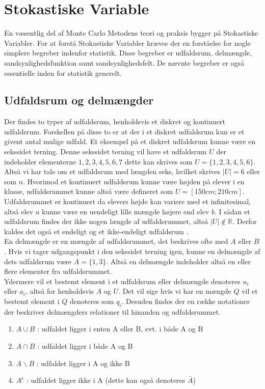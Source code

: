 \documentclass[../../SRP.tex]{subfiles}
\begin{document}
\chapter{Stokastiske Variable}

En væsentlig del af Monte Carlo Metodens teori og praksis bygger på Stokastiske Variabler. For at forstå Stokastiske Variabler kræves der en forståelse for nogle simplere begreber indenfor statistik. Disse begreber er udfaldsrum, delmængde, sandsynlighedsfunktion samt sandsynlighedsfelt. De nævnte begreber er også essentielle inden for statistik generelt.

\section{Udfaldsrum og delmængder}

Der findes to typer af udfaldsrum, henholdsvis et diskret og kontinuert udfaldsrum. Forskellen på disse to er at der i et diskret udfaldsrum kun er et givent antal mulige udfald. Et eksempel på et diskret udfaldsrum kunne være en sekssidet terning. Denne sekssidet terning vil have et udfaldsrum $U$ der indeholder elementerne $1,2,3,4,5,6,7$ dette kan skrives som $U = \{1,2,3,4,5,6\}$. Altså vi har tale om et udfaldsrum med længden seks, hvilket skrives $|U| = 6$ eller som $n$. Hvorimod et kontinuert udfaldsrum kunne være højden på elever i en klasse, udfaldsrummet kunne altså være defineret som $U = [150cm;210cm]$. Udfaldsrummet er kontinuert da elevers højde kan variere med et infinitesimal, altså elev $a$ kunne være en uendeligt lille mængde højere end elev $b$. I sådan et udfaldsrum findes der ikke nogen længde af udfaldsrummet, altså $|U| \notin \mathbb{R}$. Derfor kaldes det også et endeligt og et ikke-endeligt udfaldsrum \cite{SC}. \\

En delmængde er en mængde af udfaldsrummet, det beskrives ofte med $A$ eller $B$. Hvis vi tager udgangspunkt i den sekssidet terning igen, kunne en delmængde af dets udfaldsrum være $A = \{1,3\}$. Altså en delmængde indeholder altså en eller flere elementer fra udfaldsrummet. \\

Ydermere vil et bestemt element i et udfaldsrum eller delmængde denoteres $u_i$ eller $a_i$, altså for henholdsvis $A$ og $U$. Det vil sige hvis vi har en mængde $Q$ vil et bestemt element i $Q$ denoteres som $q_i$. Desuden findes der en række notationer der beskriver delmængders relationer til hinanden og udfaldsrummet.
\begin{enumerate}
  \item $A \cup B$ : udfaldet ligger i enten A eller B, evt. i både A og B
  \item $A \cap B$ : udfaldet ligger i både A og B
  \item $A \backslash B$ : udfaldet ligger i A og ikke B
  \item $A^c$ : udfaldet ligger ikke i A (dette kan også denoteres $\bar{A}$)
\end{enumerate}
\end{document}
